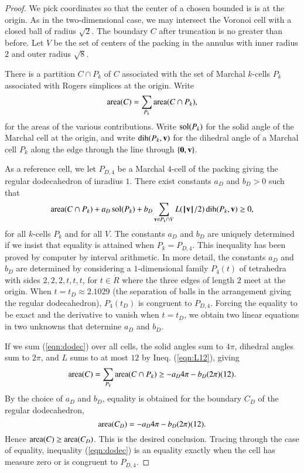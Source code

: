 \documentclass{llncs}
\def\area{\op{area}}
\begin{document}
\begin{proof}
  We pick coordinates so that the center of a chosen bounded is is at
  the origin.  As in the two-dimensional case, we may intersect the
  Voronoi cell with a closed ball of radius $\sqrt2$.  The boundary
  $C$ after truncation is no greater than before.  Let $V$ be the set
  of centers of the packing in the annulus with inner radius $2$ and
  outer radius $\sqrt8$.

There is a partition $C\cap P_k$ of  $C$ associated with the set of
Marchal $k$-cells $P_k$ associated with  Rogers simplices at the origin. 
Write 
\[
\area(C) = \sum_{P_k} \area(C\cap P_k),
\]
for the areas of the various contributions.
Write $\operatorname{sol}(P_k)$ for the solid angle of the Marchal cell at the origin, and write
$\operatorname{dih}(P_k,{\mathbf v})$ for the dihedral angle of a Marchal cell $P_k$ along the edge through
the line through $\{{\mathbf 0},{\mathbf v}\}$.  

As a reference cell, we let $P_{D,4}$ be a Marchal $4$-cell of the packing giving the
regular dodecahedron
of inradius $1$.  There exist constants $a_D$ and $b_D>0$ such
that
\begin{equation}\label{eqn:dodec}
\area(C\cap P_k) +  a_D \sol(P_k) + b_D \sum_{\v\in P_k\cap V} L(\normo{\v}/2)\dih(P_k,\v) \ge0,
\end{equation}
for all $k$-cells $P_k$ and for all $V$.  The constants $a_D$ and
$b_D$ are uniquely determined if we insist that equality is attained
when $P_k = P_{D,4}$.  This inequality has been proved by computer by
interval arithmetic.  In more detail, the constants $a_D$ and $b_D$
are determined by considering a $1$-dimensional family $P_4(t)$ of
tetrahedra with sides $2,2,2,t,t,t$, for $t\in \ring{R}$ where the
three edges of length $2$ meet at the origin.  When $t=t_D\approx
2.1029$ (the separation of balls in the arrangement giving the regular
dodecahedron), $P_4(t_D)$ is congruent to $P_{D,4}$.  Forcing the
equality to be exact and the derivative to vanish when $t=t_D$, we
obtain two linear equations in two unknowns that determine $a_D$ and
$b_D$.

If we sum (\ref{eqn:dodec}) over all cells, the solid angles sum to $4\pi$, dihedral
angles sum to $2\pi$, and $L$ sums to at most $12$ by Ineq. (\ref{eqn:L12}), giving
\[
\area(C) = \sum_{P_k}\area(C\cap P_k) \ge -a_D 4\pi - b_D (2\pi) (12).
\]
By the choice of $a_D$ and $b_D$, equality is obtained for the boundary
$C_D$ of the regular dodecahedron, 
\[
\area(C_D) = -a_D 4\pi - b_D (2\pi) (12).
\]
Hence $\area(C)\ge \area(C_D)$. This is the desired conclusion.  Tracing through
the case of equality, inequality (\ref{eqn:dodec}) is an equality exactly when the cell
has measure zero or is congruent to $P_{D,4}$.
\end{proof}
\end{document}
